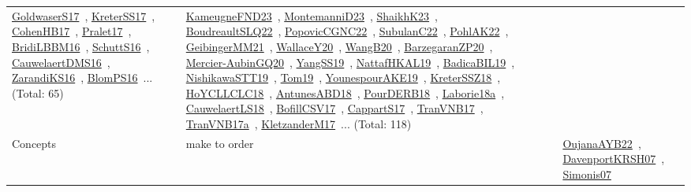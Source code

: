 {\begin{longtable}{lp{3cm}>{\raggedright\arraybackslash}p{6cm}>{\raggedright\arraybackslash}p{6cm}>{\raggedright\arraybackslash}p{8cm}}
\href{works/GoldwaserS17.pdf}{GoldwaserS17}~\cite{GoldwaserS17}, \href{works/KreterSS17.pdf}{KreterSS17}~\cite{KreterSS17}, \href{works/CohenHB17.pdf}{CohenHB17}~\cite{CohenHB17}, \href{works/Pralet17.pdf}{Pralet17}~\cite{Pralet17}, \href{works/BridiLBBM16.pdf}{BridiLBBM16}~\cite{BridiLBBM16}, \href{works/SchuttS16.pdf}{SchuttS16}~\cite{SchuttS16}, \href{works/CauwelaertDMS16.pdf}{CauwelaertDMS16}~\cite{CauwelaertDMS16}, \href{works/ZarandiKS16.pdf}{ZarandiKS16}~\cite{ZarandiKS16}, \href{works/BlomPS16.pdf}{BlomPS16}~\cite{BlomPS16}... (Total: 65) & \href{works/KameugneFND23.pdf}{KameugneFND23}~\cite{KameugneFND23}, \href{works/MontemanniD23.pdf}{MontemanniD23}~\cite{MontemanniD23}, \href{works/ShaikhK23.pdf}{ShaikhK23}~\cite{ShaikhK23}, \href{works/BoudreaultSLQ22.pdf}{BoudreaultSLQ22}~\cite{BoudreaultSLQ22}, \href{works/PopovicCGNC22.pdf}{PopovicCGNC22}~\cite{PopovicCGNC22}, \href{works/SubulanC22.pdf}{SubulanC22}~\cite{SubulanC22}, \href{works/PohlAK22.pdf}{PohlAK22}~\cite{PohlAK22}, \href{works/GeibingerMM21.pdf}{GeibingerMM21}~\cite{GeibingerMM21}, \href{works/WallaceY20.pdf}{WallaceY20}~\cite{WallaceY20}, \href{works/WangB20.pdf}{WangB20}~\cite{WangB20}, \href{works/BarzegaranZP20.pdf}{BarzegaranZP20}~\cite{BarzegaranZP20}, \href{works/Mercier-AubinGQ20.pdf}{Mercier-AubinGQ20}~\cite{Mercier-AubinGQ20}, \href{works/YangSS19.pdf}{YangSS19}~\cite{YangSS19}, \href{works/NattafHKAL19.pdf}{NattafHKAL19}~\cite{NattafHKAL19}, \href{works/BadicaBIL19.pdf}{BadicaBIL19}~\cite{BadicaBIL19}, \href{works/NishikawaSTT19.pdf}{NishikawaSTT19}~\cite{NishikawaSTT19}, \href{works/Tom19.pdf}{Tom19}~\cite{Tom19}, \href{works/YounespourAKE19.pdf}{YounespourAKE19}~\cite{YounespourAKE19}, \href{works/KreterSSZ18.pdf}{KreterSSZ18}~\cite{KreterSSZ18}, \href{works/HoYCLLCLC18.pdf}{HoYCLLCLC18}~\cite{HoYCLLCLC18}, \href{works/AntunesABD18.pdf}{AntunesABD18}~\cite{AntunesABD18}, \href{works/PourDERB18.pdf}{PourDERB18}~\cite{PourDERB18}, \href{works/Laborie18a.pdf}{Laborie18a}~\cite{Laborie18a}, \href{works/CauwelaertLS18.pdf}{CauwelaertLS18}~\cite{CauwelaertLS18}, \href{works/BofillCSV17.pdf}{BofillCSV17}~\cite{BofillCSV17}, \href{works/CappartS17.pdf}{CappartS17}~\cite{CappartS17}, \href{works/TranVNB17.pdf}{TranVNB17}~\cite{TranVNB17}, \href{works/TranVNB17a.pdf}{TranVNB17a}~\cite{TranVNB17a}, \href{works/KletzanderM17.pdf}{KletzanderM17}~\cite{KletzanderM17}... (Total: 118)\\
Concepts & make to order &  &  & \href{works/OujanaAYB22.pdf}{OujanaAYB22}~\cite{OujanaAYB22}, \href{works/DavenportKRSH07.pdf}{DavenportKRSH07}~\cite{DavenportKRSH07}, \href{works/Simonis07.pdf}{Simonis07}~\cite{Simonis07}\\

\end{longtable}}
